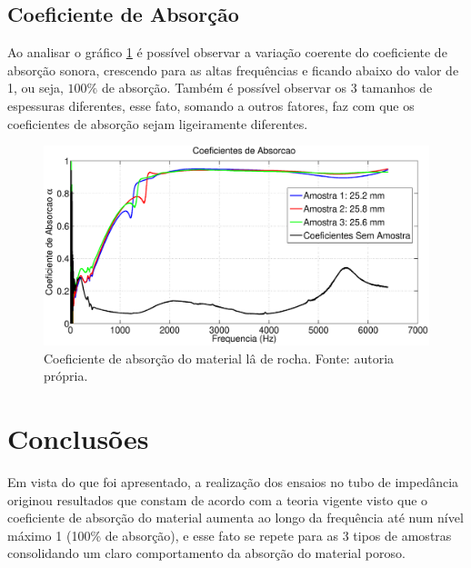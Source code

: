 \section{Coeficiente de Absorção}

Ao analisar o gráfico \ref{figura_1} é possível observar a variação coerente do coeficiente de absorção sonora, crescendo para as altas frequências e ficando abaixo do valor de 1, ou seja, $100\%$ de absorção. Também é possível observar os 3 tamanhos de espessuras diferentes, esse fato, somando a outros fatores, faz com que os coeficientes de absorção sejam ligeiramente diferentes.

\begin{figure}[h!]
    \centering
    \includegraphics[width=1.1\textwidth]{tubo.eps}
    \caption{Coeficiente de absorção do material lâ de rocha. Fonte: autoria própria.}
    \label{figura_1}
\end{figure}


\chapter{Conclusões}\label{conclusoes}

Em vista do que foi apresentado, a realização dos ensaios no tubo de impedância originou resultados que constam de acordo com a teoria vigente visto que o coeficiente de absorção do material aumenta ao longo da frequência até num nível máximo 1 (100\% de absorção), e esse fato se repete para as 3 tipos de amostras consolidando um claro comportamento da absorção do material poroso.